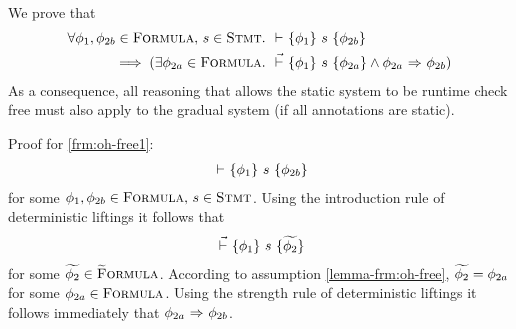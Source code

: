 \begin{proofatend}~\\
    We prove that 
    \begin{align}
    \begin{split}
    \label{frm:oh-free1}
    \forall \phi_1, \phi_{2b} \in \textup{\textsc{Formula}},\, s \in \textup{\textsc{Stmt}}.~
    &{} \,\,{\vdash}\,\, \{{\phi_1}\} ~{s}~ \{{\phi_{2b}}\} \\
    \implies 
    (\exists \phi_{2a} \in \textup{\textsc{Formula}}.~ &{} \,\,\vec{\vdash}\,\, \{{\phi_1}\} ~{s}~ \{{\phi_{2a}}\} \wedge {\phi_{2a}} \,\,{\Rightarrow}\,\, {\phi_{2b}})
    \end{split}
    \end{align}
    As a consequence, all reasoning that allows the static system to be runtime check free must also apply to the gradual system (if all annotations are static).
    
    Proof for \ref{frm:oh-free1}:
    \begin{align*}
    {} \,\,{\vdash}\,\, \{{\phi_1}\} ~{s}~ \{{\phi_{2b}}\}
    \end{align*}
    for some $\phi_1, \phi_{2b} \in \textup{\textsc{Formula}},\, s \in \textup{\textsc{Stmt}}$.
    Using the introduction rule of deterministic liftings it follows that
    \begin{align*}
    {} \,\,\vec{\vdash}\,\, \{{\phi_1}\} ~{s}~ \{{\widetilde{\phi_2}}\}
    \end{align*}
    for some $\widetilde{\phi_2} \in \textup{\textsc{\ensuremath{\widetilde{\text{F}}}ormula}}$.
    According to assumption \ref{lemma-frm:oh-free}, $\widetilde{\phi_2} = \phi_{2a}$ for some $\phi_{2a} \in \textup{\textsc{Formula}}$.
    Using the strength rule of deterministic liftings it follows immediately that ${\phi_{2a}} \,\,{\Rightarrow}\,\, {\phi_{2b}}$.
    
    \begin{comment}
    Proof for claim that optimality of $\dgthoare{}{\cdot}{\cdot}{\cdot}$ implies \ref{lemma-frm:oh-free} if \tset{\dgradT Soundness} holds.
    Let $\Phi \defeq \{~ \phi_2 ~|~ \thoare{}{\phi_1}{s}{\phi_2} ~\}$ for some  $\phi_1 \in \setFormula,\, s \in \setStmt$.
    $\Phi$ is the set of all deducible postconditions for given precondition and statement.
    If $\Phi$ is not empty, then the introduction rule of deterministic liftings implies that
    $\dgthoare{}{\phi_1}{s}{\grad{\phi_2}}$ for some $\grad{\phi_2} \in \setGFormula$.
    \begin{description}
    \item[Case 1: $\exists \pi_1, \pi_2.~ \sstepConsume{s}{\pi_1}{\pi_2} \wedge \evalphiGen{\pi_1}{\phi_1}$]~\\
    Due to soundness of the static system, it follows that
    \begin{displaymath}
    \forall \phi_2 \in \Phi.~ \evalphiGen{\pi_2}{\phi_2}
    \end{displaymath}
    \end{description}
    \end{comment}
\end{proofatend}

